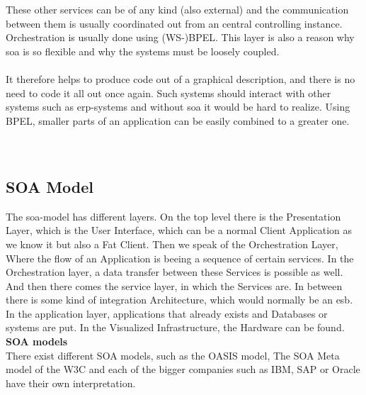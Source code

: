 \documentclass[12pt]{article}
\begin{document}
These other services can be of any kind (also external) and the communication between them is usually coordinated out from an central controlling instance. Orchestration is usually done using (WS-)BPEL. This layer is also a reason why \gls{soa} is so flexible and why the systems must be loosely coupled. \cite[page 29]{soagoesreal}\\ \\
It therefore helps to produce code out of a graphical description, and there is no need to code it all out once again. Such systems should interact with other systems such as \gls{erp}-systems and without \gls{soa} it would be hard to realize. Using BPEL, smaller parts of an application can be easily combined to a greater one. \cite[page 18]{soagoesreal} \\ \\
\\
\subsection{SOA Model}
The \gls{soa}-model has different layers. On the top level there is the Presentation Layer, which is the User Interface, which can be a normal Client Application as we know it but also a Fat Client. Then we speak of the Orchestration Layer, Where the flow of an Application is beeing a sequence of certain services. In the Orchestration layer, a data transfer between these Services is possible as well. And then there comes the service layer, in which the Services are. In between there is some kind of integration Architecture, which would normally be an \gls{esb}. In the application layer, applications that already exists and Databases or systems are put. In the Visualized Infrastructure, the Hardware can be found. %
\newpage\noindent\textbf{SOA models}\\
There exist different SOA models, such as the OASIS model, The SOA Meta model of the W3C and each of the bigger companies such as IBM, SAP or Oracle have their own interpretation.
\end{document}
